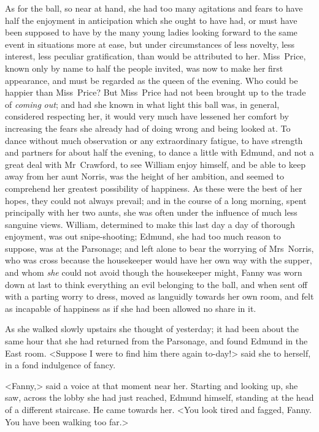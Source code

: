 As for the ball, so near at hand, she had too many agitations and fears to have half the enjoyment in anticipation which she ought to have had, or must have been supposed to have by the many young ladies looking forward to the same event in situations more at ease, but under circumstances of less novelty, less interest, less peculiar gratification, than would be attributed to her. Miss~Price, known only by name to half the people invited, was now to make her first appearance, and must be regarded as the queen of the evening. Who could be happier than Miss~Price? But Miss~Price had not been brought up to the trade of \textit{coming}  \textit{out}; and had she known in what light this ball was, in general, considered respecting her, it would very much have lessened her comfort by increasing the fears she already had of doing wrong and being looked at. To dance without much observation or any extraordinary fatigue, to have strength and partners for about half the evening, to dance a little with Edmund, and not a great deal with Mr~Crawford, to see William enjoy himself, and be able to keep away from her aunt Norris, was the height of her ambition, and seemed to comprehend her greatest possibility of happiness. As these were the best of her hopes, they could not always prevail; and in the course of a long morning, spent principally with her two aunts, she was often under the influence of much less sanguine views. William, determined to make this last day a day of thorough enjoyment, was out snipe-shooting; Edmund, she had too much reason to suppose, was at the Parsonage; and left alone to bear the worrying of Mrs~Norris, who was cross because the housekeeper would have her own way with the supper, and whom \textit{she}  could not avoid though the housekeeper might, Fanny was worn down at last to think everything an evil belonging to the ball, and when sent off with a parting worry to dress, moved as languidly towards her own room, and felt as incapable of happiness as if she had been allowed no share in it.

As she walked slowly upstairs she thought of yesterday; it had been about the same hour that she had returned from the Parsonage, and found Edmund in the East room. <Suppose I were to find him there again to-day!> said she to herself, in a fond indulgence of fancy.

<Fanny,> said a voice at that moment near her. Starting and looking up, she saw, across the lobby she had just reached, Edmund himself, standing at the head of a different staircase. He came towards her. <You look tired and fagged, Fanny. You have been walking too far.>


